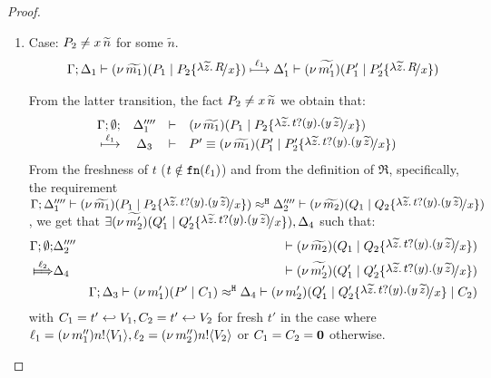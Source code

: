 \begin{proof}
\begin{enumerate}
	\item Case: $P_2 \not= x\, {\widetilde{n}}$ for some $\widetilde{n}$.
%
	\begin{eqnarray}
		&&	\horel{\Gamma}{\Delta_1}
		{\newsp{\widetilde{m_1}}{P_1 \Par P_2 \subst{\abs{\widetilde{z}}{R}}{x}}}
		{\hby{\ell_1}}
		{\Delta_1'}{\newsp{\widetilde{m_1'}}{P_1' \Par P_2' \subst{\abs{\widetilde{z}}{R}}{x}}}
		\label{lem:subst_equiv0}
	\end{eqnarray}

	\noi From the latter transition, the fact $P_2 \not= x\, {\widetilde{n}}$ we obtain that:
%
\[
		\mhorel{\Gamma}{\Delta_1''''}{\newsp{\widetilde{m_1}}{P_1 \Par P_2 \subst{\auxtr{t}}{x}}}
		{\hby{\ell_1}}{\Delta_3}{P' \scong}{\newsp{\widetilde{m_1}}{P_1' \Par P_2' \subst{\auxtr{t}}{x}}}
\]
%
	\noi
		From the freshness of $t$ ($t \notin \mathtt{fn}(\ell_1)$) and
		from the definition of $\Re$, specifically, the requirement
		$\horel{\Gamma}{\Delta_1''''}
		{\newsp{\widetilde{m_1}}{P_1 \Par P_2 \subst{\auxtr{t}}{x} }}
		{\hwb}
		{\Delta_2''''}{\newsp{\widetilde{m_2}}{Q_1 \Par Q_2 \subst{\auxtr{t}}{x}}}$, we get that
		$\exists \newsp{\widetilde{m_2'}}{Q_1' \Par Q_2' \subst{\auxtr{t}}{x}}, \Delta_4$ such that:
%
	\begin{eqnarray}
		\Gamma; \es; &\Delta_2''''& \proves \newsp{\widetilde{m_2}}{Q_1 \Par Q_2 \subst{\auxtr{t}}{x}} \nonumber \\
		\Hby{\ell_2} &\Delta_4& \proves \newsp{\widetilde{m_2'}}{Q_1' \Par Q_2' \subst{\auxtr{t}}{x}}
		\label{lem:subst_equiv1}
		\\
		&&\horel{\Gamma}{\Delta_3}{\newsp{m_1'}{P' \Par C_1}}{\hwb}{\Delta_4}{\newsp{m_2'}{Q_1' \Par Q_2' \subst{\auxtr{t}}{x} \Par C_2}} \label{lem:subst_equiv2}
	\end{eqnarray}
%
	\noi with $C_1 = t' \hookleftarrow V_1, C_2 = t' \hookleftarrow V_2$ for fresh $t'$
	in the case where $\ell_1 = (\nu\, m_1'')n ! \langle V_1 \rangle, \ell_2 = (\nu\, m_2'')n ! \langle V_2 \rangle$ or $C_1 = C_2 = \mathbf{0}$ otherwise.   
 

\end{enumerate}
\end{proof}
